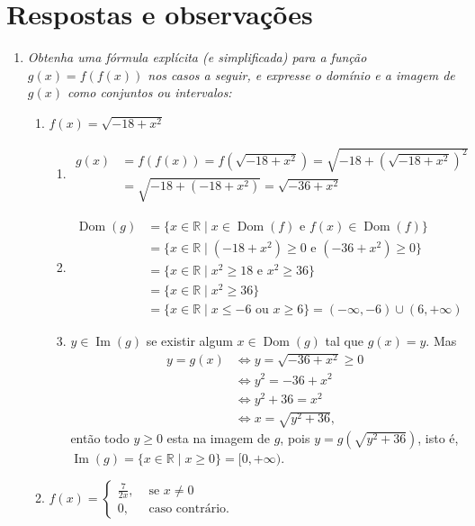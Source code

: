 \documentclass[12pt,a4paper]{article}
\newcommand*\dom[1]{\operatorname{Dom}\left(#1\right)}
\newcommand*\im[1]{\operatorname{Im}\left(#1\right)}
\newcommand*\R{\mathbb{R}}
\begin{document}
\section*{Respostas e observações}
\begin{enumerate}
\item \textit{Obtenha uma fórmula explícita (e simplificada) para a função $g(x) = f( f(x) )$ nos casos a seguir, e expresse o domínio e a imagem de $g(x)$ como conjuntos ou intervalos:}
\begin{enumerate}
\item $f(x) = \sqrt{ -18 + x^2 }$

\begin{enumerate}
\item \begin{align*}
g(x)
& = f\left( f(x) \right)
  = f\left( \sqrt{ -18 + x^2 } \right)
  = \sqrt{ -18 + \left( \sqrt{ -18 + x^2 } \right)^2 } \\
& = \sqrt{ -18 + ( -18 + x^2 ) }
  = \sqrt{ -36 + x^2 }
\end{align*}
\item \begin{align*}
\dom{g}
& = \{ x \in \R \mid x \in \dom{f} \text{ e } f(x) \in \dom{f} \} \\
& = \{ x \in \R \mid (-18 + x^2) \geq 0 \text{ e } (-36 + x^2) \geq 0 \} \\
& = \{ x \in \R \mid x^2 \geq 18 \text{ e } x^2 \geq 36 \} \\
& = \{ x \in \R \mid x^2 \geq 36 \} \\
& = \{ x \in \R \mid x \leq -6 \text{ ou } x \geq 6\} = (-\infty, -6) \cup (6, +\infty)
\end{align*}

\item $y \in \im{g}$ se existir algum $x \in \dom{g}$ tal que $g(x) = y$. Mas
\begin{align*}
y = g(x)
& \Leftrightarrow y = \sqrt{ -36 + x^2 } \geq 0 \\
& \Leftrightarrow y^2 = -36 + x^2 \\
& \Leftrightarrow y^2 + 36 = x^2 \\
& \Leftrightarrow x = \sqrt{ y^2 + 36 },
\end{align*}
então todo $y \geq 0$ esta na imagem de $g$, pois $y = g( \sqrt{ y^2 + 36 } )$, isto é, $\im{g} = \{ x \in \R \mid x \geq 0 \} = [0, +\infty)$.
\end{enumerate}


\item $f(x) = \begin{cases}
\frac{7}{2x},& \text{ se } x \neq 0\\
0, & \text{ caso contrário.}
\end{cases}$


\end{enumerate}
\end{enumerate}
\end{document}

